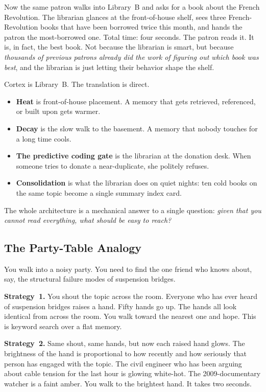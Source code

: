 \documentclass[11pt]{article}
\begin{document}
Now the same patron walks into Library~B and asks for a book about
the French Revolution.  The librarian glances at the front-of-house
shelf, sees three French-Revolution books that have been borrowed
twice this month, and hands the patron the most-borrowed one.
Total time: four seconds.  The patron reads it.  It is, in fact,
the best book.  Not because the librarian is smart, but because
\emph{thousands of previous patrons already did the work of figuring
out which book was best}, and the librarian is just letting their
behavior shape the shelf.

Cortex is Library~B.  The translation is direct.
\begin{itemize}
  \item \textbf{Heat} is front-of-house placement.  A memory that
        gets retrieved, referenced, or built upon gets warmer.
  \item \textbf{Decay} is the slow walk to the basement.  A memory
        that nobody touches for a long time cools.
  \item \textbf{The predictive coding gate} is the librarian at
        the donation desk.  When someone tries to donate a
        near-duplicate, she politely refuses.
  \item \textbf{Consolidation} is what the librarian does on quiet
        nights: ten cold books on the same topic become a single
        summary index card.
\end{itemize}

The whole architecture is a mechanical answer to a single question:
\emph{given that you cannot read everything, what should be easy to
reach?}

\subsection{The Party-Table Analogy}
\label{app:feynman-party}

You walk into a noisy party.  You need to find the one friend who
knows about, say, the structural failure modes of suspension
bridges.

\textbf{Strategy~1.} You shout the topic across the room.  Everyone
who has ever heard of suspension bridges raises a hand.  Fifty
hands go up.  The hands all look identical from across the room.
You walk toward the nearest one and hope.  This is keyword search
over a flat memory.

\textbf{Strategy~2.} Same shout, same hands, but now each raised
hand glows.  The brightness of the hand is proportional to how
recently and how seriously that person has engaged with the topic.
The civil engineer who has been arguing about cable tension for the
last hour is glowing white-hot.  The 2009-documentary watcher is a
faint amber.  You walk to the brightest hand.  It takes two
seconds.
\end{document}
